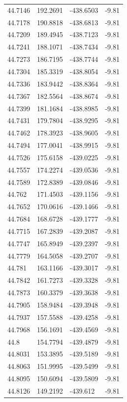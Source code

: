 \begin{table}[H]
\begin{tabular}{llll}
44.7146 & 192.2691 & -438.6503 & -9.81 \\
44.7178 & 190.8818 & -438.6813 & -9.81 \\
44.7209 & 189.4945 & -438.7123 & -9.81 \\
44.7241 & 188.1071 & -438.7434 & -9.81 \\
44.7273 & 186.7195 & -438.7744 & -9.81 \\
44.7304 & 185.3319 & -438.8054 & -9.81 \\
44.7336 & 183.9442 & -438.8364 & -9.81 \\
44.7367 & 182.5564 & -438.8674 & -9.81 \\
44.7399 & 181.1684 & -438.8985 & -9.81 \\
44.7431 & 179.7804 & -438.9295 & -9.81 \\
44.7462 & 178.3923 & -438.9605 & -9.81 \\
44.7494 & 177.0041 & -438.9915 & -9.81 \\
44.7526 & 175.6158 & -439.0225 & -9.81 \\
44.7557 & 174.2274 & -439.0536 & -9.81 \\
44.7589 & 172.8389 & -439.0846 & -9.81 \\
44.762 & 171.4503 & -439.1156 & -9.81 \\
44.7652 & 170.0616 & -439.1466 & -9.81 \\
44.7684 & 168.6728 & -439.1777 & -9.81 \\
44.7715 & 167.2839 & -439.2087 & -9.81 \\
44.7747 & 165.8949 & -439.2397 & -9.81 \\
44.7779 & 164.5058 & -439.2707 & -9.81 \\
44.781 & 163.1166 & -439.3017 & -9.81 \\
44.7842 & 161.7273 & -439.3328 & -9.81 \\
44.7873 & 160.3379 & -439.3638 & -9.81 \\
44.7905 & 158.9484 & -439.3948 & -9.81 \\
44.7937 & 157.5588 & -439.4258 & -9.81 \\
44.7968 & 156.1691 & -439.4569 & -9.81 \\
44.8 & 154.7794 & -439.4879 & -9.81 \\
44.8031 & 153.3895 & -439.5189 & -9.81 \\
44.8063 & 151.9995 & -439.5499 & -9.81 \\
44.8095 & 150.6094 & -439.5809 & -9.81 \\
44.8126 & 149.2192 & -439.612 & -9.81 \\

\end{tabular}
\end{table}
